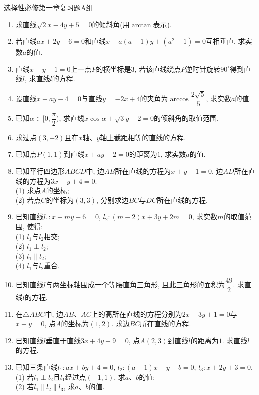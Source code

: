 \documentclass[10pt,a4paper]{article}
\begin{document}
选择性必修第一章复习题A组

\begin{enumerate}[1.]

\item 求直线$\sqrt 2x-4y+5=0$的倾斜角(用$\arctan$表示).
\vspace*{3cm}
\item 若直线$ax+2y+6=0$和直线$x+a(a+1)y+(a^2-1)=0$互相垂直, 求实数$a$的值.
\vspace*{3cm}
\item 直线$x-y+1=0$上一点$P$的横坐标是$3$, 若该直线绕点$P$逆时针旋转$90^\circ$得到直线$l$, 求直线$l$的方程.
\vspace*{3cm}
\item 设直线$x-ay-4=0$与直线$y=-2x+4$的夹角为$\arccos \dfrac{2\sqrt 5}5$, 求实数$a$的值.
\vspace*{3cm}
\item 已知$\alpha\in [0, \dfrac\pi 2)$, 求直线$x\cos \alpha+\sqrt 3y+2=0$的倾斜角的取值范围.
\vspace*{3cm}
\item 求过点$(3, -2)$且在$x$轴、$y$轴上截距相等的直线的方程.
\vspace*{3cm}
\item 已知点$P(1, 1)$到直线$x+ay-2=0$的距离为$1$, 求实数$a$的值.
\vspace*{3cm}
\item 已知平行四边形$ABCD$中, 边$AB$所在直线的方程为$x+y-1=0$, 边$AD$所在直线的方程为$3x-y+4=0$.\\
(1) 求点$A$的坐标;\\
(2) 若点$C$的坐标为$(3, 3)$, 分别求边$BC$与$DC$所在直线的方程.
\vspace*{3cm}
\item 已知直线$l_1: x+my+6=0$, $l_2: (m-2)x+3y+2m=0$, 求实数$m$的取值范围, 使得:\\
(1) $l_1$与$l_2$相交;\\
(2) $l_1\perp l_2$;\\
(3) $l_1\parallel l_2$;\\
(4) $l_1$与$l_2$重合.
\vspace*{3cm}
\item 已知直线$l$与两坐标轴围成一个等腰直角三角形, 且此三角形的面积为$\dfrac{49}2$. 求直线$l$的方程.
\vspace*{3cm}
\item 在$\triangle ABC$中, 边$AB$、$AC$上的高所在直线的方程分别为$2x-3y+1=0$与$x+y=0$, 点$A$的坐标为$(1, 2)$. 求边$BC$所在直线的方程.
\vspace*{3cm}
\item 已知直线$l$垂直于直线$3x+4y-9=0$, 点$A(2, 3)$到直线$l$的距离为$1$. 求直线$l$的方程.
\vspace*{3cm}
\item 已知三条直线$l_1: ax+by+4=0$, $l_2: (a-1)x+y+b=0$, $l_3: x+2y+3=0$.\\
(1) 若$l_1\perp l_2$且$l_1$经过点$(-1, 1)$, 求$a$、$b$的值;\\
(2) 若$l_1\parallel l_2\parallel l_3$, 求$a$、$b$的值.
\vspace*{3cm}
\end{enumerate}
\end{document}

